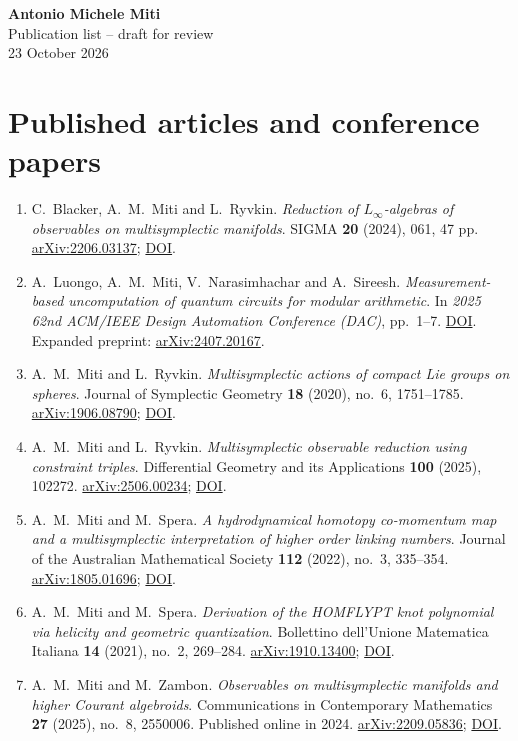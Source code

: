 \documentclass[11pt,a4paper]{article}
\begin{document}
\begin{center}{\LARGE\bfseries Antonio Michele Miti}\\[0.25em]{\Large Publication list -- draft for review}\\[0.2em]{\small 23 October 2026}\end{center}
\section*{Published articles and conference papers}
\begin{enumerate}
\item C.~Blacker, A.~M.~Miti and L.~Ryvkin. \emph{Reduction of $L_\infty$-algebras of observables on multisymplectic manifolds}. SIGMA \textbf{20} (2024), 061, 47 pp. \href{https://arxiv.org/abs/2206.03137}{arXiv:2206.03137}; \href{https://doi.org/10.3842/SIGMA.2024.061}{DOI}.
\item A.~Luongo, A.~M.~Miti, V.~Narasimhachar and A.~Sireesh. \emph{Measurement-based uncomputation of quantum circuits for modular arithmetic}. In \emph{2025 62nd ACM/IEEE Design Automation Conference (DAC)}, pp.~1--7. \href{https://doi.org/10.1109/DAC63849.2025.11132981}{DOI}. Expanded preprint: \href{https://arxiv.org/abs/2407.20167}{arXiv:2407.20167}.
\item A.~M.~Miti and L.~Ryvkin. \emph{Multisymplectic actions of compact Lie groups on spheres}. Journal of Symplectic Geometry \textbf{18} (2020), no.~6, 1751--1785. \href{https://arxiv.org/abs/1906.08790}{arXiv:1906.08790}; \href{https://doi.org/10.4310/JSG.2020.v18.n6.a6}{DOI}.
\item A.~M.~Miti and L.~Ryvkin. \emph{Multisymplectic observable reduction using constraint triples}. Differential Geometry and its Applications \textbf{100} (2025), 102272. \href{https://arxiv.org/abs/2506.00234}{arXiv:2506.00234}; \href{https://doi.org/10.1016/j.difgeo.2025.102272}{DOI}.
\item A.~M.~Miti and M.~Spera. \emph{A hydrodynamical homotopy co-momentum map and a multisymplectic interpretation of higher order linking numbers}. Journal of the Australian Mathematical Society \textbf{112} (2022), no.~3, 335--354. \href{https://arxiv.org/abs/1805.01696}{arXiv:1805.01696}; \href{https://doi.org/10.1017/S1446788720000518}{DOI}.
\item A.~M.~Miti and M.~Spera. \emph{Derivation of the HOMFLYPT knot polynomial via helicity and geometric quantization}. Bollettino dell'Unione Matematica Italiana \textbf{14} (2021), no.~2, 269--284. \href{https://arxiv.org/abs/1910.13400}{arXiv:1910.13400}; \href{https://doi.org/10.1007/s40574-020-00254-5}{DOI}.
\item A.~M.~Miti and M.~Zambon. \emph{Observables on multisymplectic manifolds and higher Courant algebroids}. Communications in Contemporary Mathematics \textbf{27} (2025), no.~8, 2550006. Published online in 2024. \href{https://arxiv.org/abs/2209.05836}{arXiv:2209.05836}; \href{https://doi.org/10.1142/S0219199725500063}{DOI}.
\end{enumerate}
\end{document}
